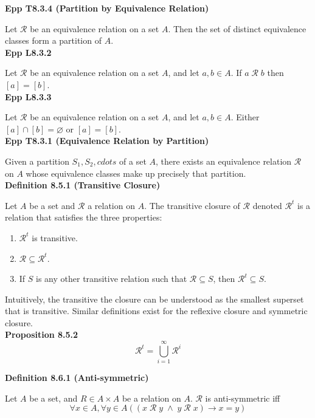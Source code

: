\documentclass[a4paper]{article}
\newcommand{\subheading}[1]{{\scriptsize\textbf{#1}}}
\begin{document}
\begin{multicols*}{4}
\subheading{Epp T8.3.4 (Partition by Equivalence Relation)}

Let $\mathcal{R}$ be an equivalence relation on a set $A$. Then the set of
distinct equivalence classes form a partition of $A$.\\

\subheading{Epp L8.3.2}

Let $\mathcal{R}$ be an equivalence relation on a set $A$, and let $a, b \in A$.
If $a\;\mathcal{R}\;b$ then $[a]=[b]$.\\

\subheading{Epp L8.3.3}

Let $\mathcal{R}$ be an equivalence relation on a set $A$, and let $a, b \in A$.
Either $[a] \cap [b] = \varnothing$ or $[a] = [b]$.\\

\subheading{Epp T8.3.1 (Equivalence Relation by Partition)}

Given a partition $S_1, S_2, cdots$ of a set $A$, there exists an equivalence
relation $\mathcal{R}$ on $A$ whose equivalence classes make up precisely that
partition. \\

\subheading{Definition 8.5.1 (Transitive Closure)}

Let $A$ be a set and $\mathcal{R}$ a relation on $A$. The transitive closure of
$\mathcal{R}$ denoted $\mathcal{R}^t$ is a relation that satisfies the three
properties:
\begin{enumerate} \itemsep -0.5em
  \item $\mathcal{R}^t$ is transitive.
  \item $\mathcal{R} \subseteq \mathcal{R}^t$.
  \item If $\textit{S}$ is any other transitive relation such that $\mathcal{R}
    \subseteq \textit{S}$, then $\mathcal{R}^t \subseteq \textit{S}$.
\end{enumerate}
Intuitively, the transitive the closure can be understood as the smallest
superset that is transitive. Similar definitions exist for the reflexive closure
and symmetric closure.\\


\subheading{Proposition 8.5.2}
$$\mathcal{R}^t = \bigcup^\infty_{i=1} \mathcal{R}^i$$

\subheading{Definition 8.6.1 (Anti-symmetric)}

Let $A$ be a set, and $R \in A \times A$ be a relation on $A$. $\mathcal{R}$ is
anti-symmetric iff
$$\forall x \in A, \forall y \in A
  ((x\;\mathcal{R}\;y\;\land\;y\;\mathcal{R}\;x) \rightarrow x = y)$$


\end{multicols*}
\end{document}
